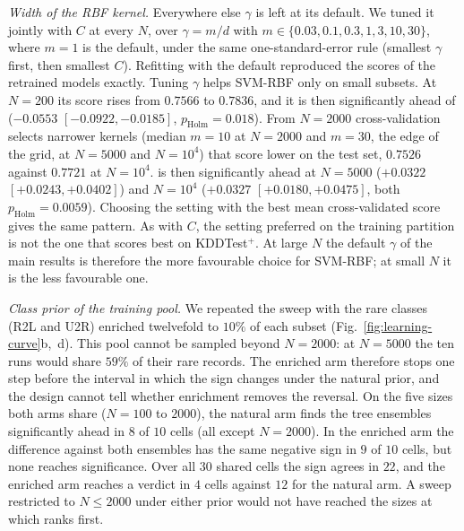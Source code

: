 \emph{Width of the RBF kernel.} Everywhere else $\gamma$ is left at its default. We tuned it
jointly with $C$ at every $N$, over $\gamma=m/d$ with $m\in\{0.03,0.1,0.3,1,3,10,30\}$, where
$m=1$ is the default, under the same one-standard-error rule (smallest $\gamma$ first, then
smallest $C$). Refitting with the default reproduced the scores of the retrained models exactly. Tuning
$\gamma$ helps SVM-RBF only on small subsets. At $N=200$ its score rises from $0.7566$ to
$0.7836$, and it is then significantly ahead of \QSVM{} ($-0.0553$ $[-0.0922,-0.0185]$,
$p_{\mathrm{Holm}}=0.018$). From $N=2000$ cross-validation selects narrower kernels (median
$m=10$ at $N=2000$ and $m=30$, the edge of the grid, at $N=5000$ and $N=10^4$) that score lower
on the test set, $0.7526$ against $0.7721$ at $N=10^4$. \QSVM{} is then significantly ahead at
$N=5000$ ($+0.0322$ $[+0.0243,+0.0402]$) and $N=10^4$ ($+0.0327$ $[+0.0180,+0.0475]$, both
$p_{\mathrm{Holm}}=0.0059$). Choosing the setting with the best mean cross-validated score
gives the same pattern. As with $C$, the setting preferred on the training partition is not
the one that scores best on KDDTest$^+$. At large $N$ the default $\gamma$ of the main
results is therefore the more favourable choice for SVM-RBF; at small $N$ it is the less
favourable one.

\emph{Class prior of the training pool.} We repeated the sweep with the rare classes (R2L and
U2R) enriched twelvefold to $10\%$ of each subset (Fig.~\ref{fig:learning-curve}b,~d). This pool
cannot be sampled beyond $N=2000$: at $N=5000$ the ten runs would share $59\%$ of their rare
records. The enriched arm therefore stops one step before the interval in which the sign changes
under the natural prior, and the design cannot tell whether enrichment removes the reversal. On
the five sizes both arms share ($N=100$ to $2000$), the natural arm finds the tree ensembles
significantly ahead in $8$ of $10$ cells (all except $N=2000$). In the enriched arm the
difference against both ensembles has the same negative sign in $9$ of $10$ cells, but none
reaches significance. Over all $30$ shared cells the sign agrees in $22$, and the enriched arm
reaches a verdict in $4$ cells against $12$ for the natural arm. A sweep restricted to
$N\leq2000$ under either prior would not have reached the sizes at which \QSVM{} ranks first.

